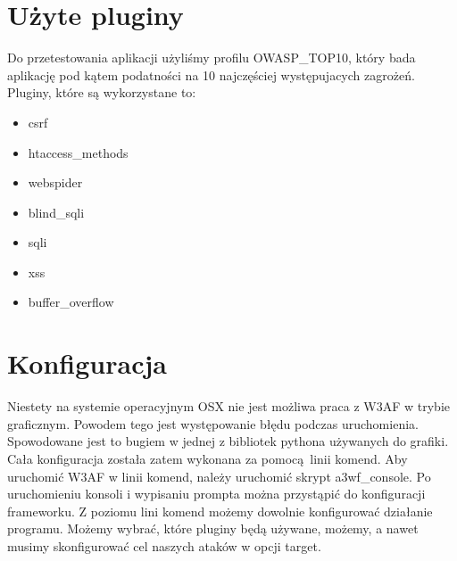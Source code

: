 \section{Użyte pluginy}

Do przetestowania aplikacji użyliśmy profilu OWASP\_TOP10, który bada aplikację pod kątem podatności na 10 najczęściej występujacych zagrożeń. Pluginy, które są wykorzystane to:
\begin{itemize}
\item csrf
\item htaccess\_methods
\item webspider
\item blind\_sqli
\item sqli
\item xss
\item buffer\_overflow
\end{itemize}

\section{Konfiguracja}

Niestety na systemie operacyjnym OSX nie jest możliwa praca z W3AF w trybie graficznym. Powodem tego jest występowanie błędu podczas uruchomienia. Spowodowane jest to bugiem w jednej z bibliotek pythona używanych do grafiki. Cała konfiguracja została zatem wykonana za pomocą linii komend. Aby uruchomić W3AF w linii komend, należy uruchomić skrypt a3wf\_console. Po uruchomieniu konsoli i wypisaniu prompta można przystąpić do konfiguracji frameworku. Z poziomu lini komend możemy dowolnie konfigurować działanie programu. Możemy wybrać, które pluginy będą używane, możemy, a nawet musimy skonfigurować cel naszych ataków w opcji target.
\noindent
\begin{minipage}{\linewidth}
\label{erd}
\end{minipage}

\noindent
\begin{minipage}{\linewidth}
\label{erd}
\end{minipage}

\noindent
\begin{minipage}{\linewidth}
\label{erd}
\end{minipage}

